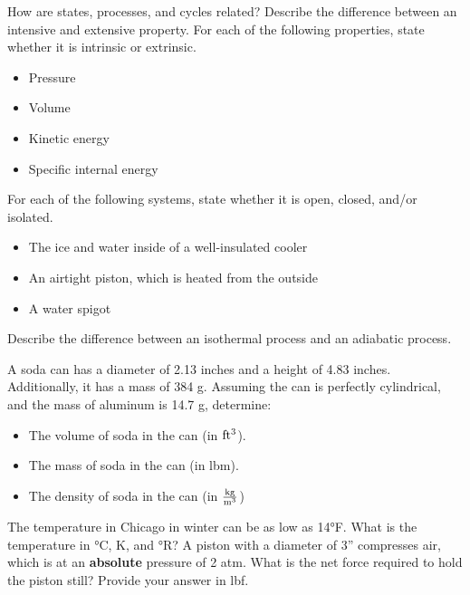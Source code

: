 
\begin{homework}
\question How are states, processes, and cycles related?
\question Describe the difference between an intensive and extensive property.
\question For each of the following properties, state whether it is intrinsic or extrinsic.
\begin{itemize}
\item Pressure
\item Volume
\item Kinetic energy
\item Specific internal energy
\end{itemize}
\question For each of the following systems, state whether it is open, closed, and/or isolated.
\begin{itemize}
\item The ice and water inside of a well-insulated cooler
\item An airtight piston, which is heated from the outside
\item A water spigot
\end{itemize}
\question Describe the difference between an isothermal process and an adiabatic process.

\question A soda can has a diameter of 2.13 inches and a height of 4.83 inches.  Additionally, it has a mass of 384 g.  Assuming the can is perfectly cylindrical, and the mass of aluminum is 14.7 g, determine:
\begin{itemize}
\item The volume of soda in the can (in ${\rm ft^3}$). \answer{[0.0100 ${\rm ft^3}$]}
\item The mass of soda in the can (in lbm). \answer{[0.812 lbm]}
\item The density of soda in the can (in $\frac{\rm kg}{\rm m^3}$) \answer{[1304 $\frac{\rm kg}{\rm m^3}$]}
\end{itemize}
\question The temperature in Chicago in winter can be as low as 14°F. What is the temperature in °C, K, and °R?
\question A piston with a diameter of 3'' compresses air, which is at an {\bf absolute} pressure of 2 atm.  What is the net force required to hold the piston still? Provide your answer in lbf. \answer{[103.9 lbf]}



\end{homework}

